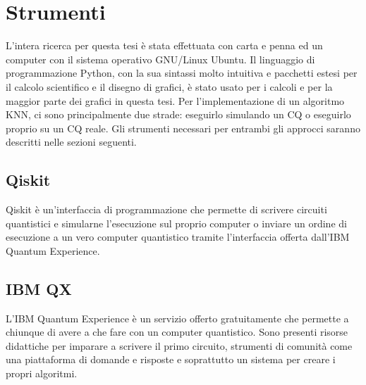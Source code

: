 \chapter{Strumenti}\label{ch:strumenti}

L'intera ricerca per questa tesi è stata effettuata con carta e penna ed un 
computer con il sistema operativo GNU/Linux Ubuntu. Il linguaggio di 
programmazione Python, con la sua sintassi molto intuitiva e pacchetti estesi 
per il calcolo scientifico e il disegno di grafici, è stato usato per i calcoli 
e per la maggior parte dei grafici in questa tesi. 
Per l'implementazione di un algoritmo \ac{KNN}, ci sono principalmente due 
strade: eseguirlo simulando un \ac{CQ} o eseguirlo proprio su un \ac{CQ} reale. 
Gli strumenti necessari per entrambi gli approcci saranno descritti nelle 
sezioni seguenti. 

\section{Qiskit}

Qiskit è un'interfaccia di programmazione che permette di scrivere 
circuiti quantistici e simularne l'esecuzione sul proprio computer 
o inviare un ordine di esecuzione a un vero computer quantistico tramite 
l'interfaccia offerta dall'IBM Quantum Experience.  

\section{IBM QX}

L'IBM Quantum Experience è un servizio offerto gratuitamente che permette 
a chiunque di avere a che fare con un computer quantistico. Sono presenti 
risorse didattiche per imparare a scrivere il primo circuito, strumenti 
di comunità come una piattaforma di domande e risposte e soprattutto 
un sistema per creare i propri algoritmi. 